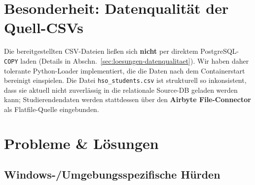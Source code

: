 \documentclass[a4paper,12pt]{article}
\begin{document}
\section{Besonderheit: Datenqualität der Quell-CSVs}
\label{sec:datenqualitaet}
 
Die bereitgestellten CSV-Dateien ließen sich \textbf{nicht} per direktem
PostgreSQL-\texttt{COPY} laden (Details in Abschn.~\ref{sec:loesungen-datenqualitaet}).
Wir haben daher tolerante Python-Loader implementiert, die die Daten nach dem
Containerstart bereinigt einspielen. Die Datei \texttt{hso\_students.csv} ist
strukturell so inkonsistent, dass sie aktuell nicht zuverlässig in die relationale
Source-DB geladen werden kann; Studierendendaten werden stattdessen über den
\textbf{Airbyte File-Connector} als Flatfile-Quelle eingebunden.
 
\section{Probleme \& Lösungen}
 
\subsection{Windows-/Umgebungsspezifische Hürden}
 
\end{document}
